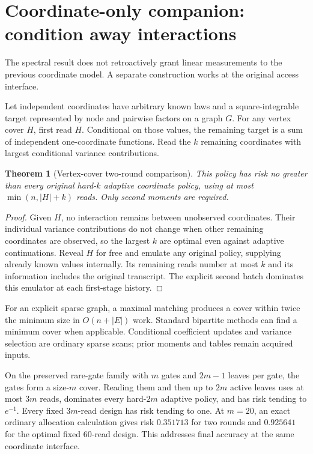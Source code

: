 \documentclass[11pt,a4paper]{article}
\newtheorem{theorem}{Theorem}\newtheorem{lemma}[theorem]{Lemma}
\begin{document}
\section{Coordinate-only companion: condition away interactions}

The spectral result does not retroactively grant linear measurements to the previous coordinate model. A separate construction works at the original access interface.

Let independent coordinates have arbitrary known laws and a square-integrable target represented by node and pairwise factors on a graph $G$. For any vertex cover $H$, first read $H$. Conditional on those values, the remaining target is a sum of independent one-coordinate functions. Read the $k$ remaining coordinates with largest conditional variance contributions.

\begin{theorem}[Vertex-cover two-round comparison]
This policy has risk no greater than every original hard-$k$ adaptive coordinate policy, using at most $\min(n,|H|+k)$ reads. Only second moments are required.
\end{theorem}
\begin{proof}
Given $H$, no interaction remains between unobserved coordinates. Their individual variance contributions do not change when other remaining coordinates are observed, so the largest $k$ are optimal even against adaptive continuations. Reveal $H$ for free and emulate any original policy, supplying already known values internally. Its remaining reads number at most $k$ and its information includes the original transcript. The explicit second batch dominates this emulator at each first-stage history.
\end{proof}

For an explicit sparse graph, a maximal matching produces a cover within twice the minimum size in $O(n+|E|)$ work. Standard bipartite methods can find a minimum cover when applicable. Conditional coefficient updates and variance selection are ordinary sparse scans; prior moments and tables remain acquired inputs.

On the preserved rare-gate family with $m$ gates and $2m-1$ leaves per gate, the gates form a size-$m$ cover. Reading them and then up to $2m$ active leaves uses at most $3m$ reads, dominates every hard-$2m$ adaptive policy, and has risk tending to $e^{-1}$. Every fixed $3m$-read design has risk tending to one. At $m=20$, an exact ordinary allocation calculation gives risk $0.351713$ for two rounds and $0.925641$ for the optimal fixed 60-read design. This addresses final accuracy at the same coordinate interface.
\end{document}
